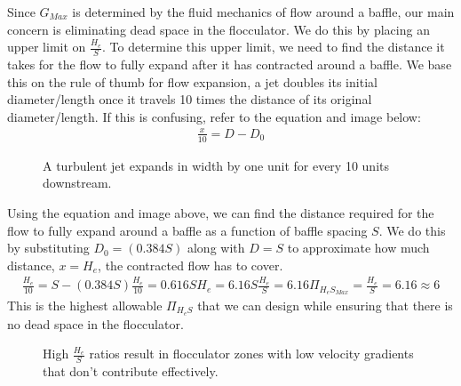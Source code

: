 \documentclass[letterpaper,10pt,english]{sphinxmanual}
\let\sphinxpxdimen\pdfpxdimen\else\newdimen\sphinxpxdimen
\begin{document}
Since \(G_{Max}\) is determined by the fluid mechanics of flow around a baffle, our main concern is eliminating dead space in the flocculator. We do this by placing an upper limit on \(\frac{H_e}{S}\). To determine this upper limit, we need to find the distance it takes for the flow to fully expand after it has contracted around a baffle. We base this on the rule of thumb for flow expansion, a jet doubles its initial diameter/length once it travels 10 times the distance of its original diameter/length. If this is confusing, refer to the equation and image below:
\begin{equation}\label{equation:Flocculation/Floc_Design:Flocculation/Floc_Design:11}
\begin{split}\frac{x}{10} = D - D_0\end{split}
\end{equation}
\begin{figure}[htbp]
\centering
\capstart

\noindent\sphinxincludegraphics[width=400\sphinxpxdimen]{{Jet_expansion_flocculator}.jpg}
\caption{A turbulent jet expands in width by one unit for every 10 units downstream.}\label{\detokenize{Flocculation/Floc_Design:id9}}\label{\detokenize{Flocculation/Floc_Design:figure-jet-expansion-flocculator}}\end{figure}

Using the equation and image above, we can find the distance required for the flow to fully expand around a baffle as a function of baffle spacing \(S\). We do this by substituting  \(D_0 = (0.384 S)\) along with \(D = S\) to approximate how much distance, \(x = H_e\), the contracted flow has to cover.
\begin{equation}\label{equation:Flocculation/Floc_Design:Flocculation/Floc_Design:12}
\begin{split}\frac{H_e}{10} = S - (0.384 S)
\frac{H_e}{10} = 0.616 S
H_e = 6.16S
\frac{H_e}{S} = 6.16
\Pi_{H_eS_{Max}} = \frac{H_e}{S} = 6.16 \approx 6\end{split}
\end{equation}
This is the highest allowable \(\Pi_{H_eS}\) that we can design while ensuring that there is no dead space in the flocculator.

\begin{figure}[htbp]
\centering
\capstart

\noindent{}
\caption{High \(\frac{H_e}{S}\) ratios result in flocculator zones with low velocity gradients that don’t contribute effectively.}\label{\detokenize{Flocculation/Floc_Design:id10}}\label{\detokenize{Flocculation/Floc_Design:figure-cfd-baffle-image}}\end{figure}
\end{document}
